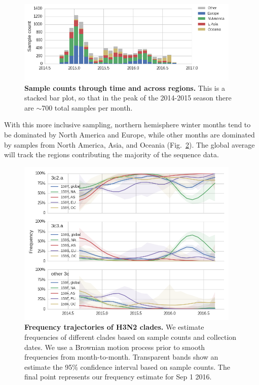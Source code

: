 \documentclass[11pt,oneside,letterpaper]{article}
\begin{document}
\begin{figure}[H]
	\centering
	\includegraphics[width=0.95\textwidth]{../figures/sep-2016/H3N2_counts_all.png}
	\caption{\textbf{Sample counts through time and across regions.}
	This is a stacked bar plot, so that in the peak of the 2014-2015 season there are $\sim$700 total samples per month.
	}
	\label{H3N2_counts_all}
\end{figure}

\pagebreak

With this more inclusive sampling, northern hemisphere winter months tend to be dominated by North America and Europe, while other months are dominated by samples from North America, Asia, and Oceania (Fig.\ \ref{H3N2_clades_all}). The global average will track the regions contributing the majority of the sequence data.

\begin{figure}[H]
	\centering
	\includegraphics[width=0.95\textwidth]{../figures/sep-2016/H3N2_clades_all.png}
	\caption{\textbf{Frequency trajectories of H3N2 clades.}
	We estimate frequencies of different clades based on sample counts and collection dates.
	We use a Brownian motion process prior to smooth frequencies from month-to-month.
	Transparent bands show an estimate the 95\% confidence interval based on sample counts.
	The final point represents our frequency estimate for Sep 1 2016.
	}
	\label{H3N2_clades_all}
\end{figure}
\end{document}
